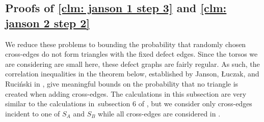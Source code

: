 \documentclass[11pt]{article}
\newcommand{\gd}[1]{{\color{blue}[Greg: #1]}}
\newcommand{\overbar}[1]{\mkern 1.5mu\overline{\mkern-1.5mu#1\mkern-1.5mu}\mkern 1.5mu}
\theoremstyle{plain}
\begin{document}

    
    

    \subsection{Proofs of \cref{clm: janson 1 step 3} and \cref{clm: janson 2 step 2}}\label{sec: janson args}



We reduce these problems to bounding the probability that randomly chosen cross-edges do not form triangles with the fixed defect edges. Since the torsos we are considering are small here, these defect graphs are fairly regular. As such, the correlation inequalities in the theorem below, established by Janson, {\L}uczak, and Ruci\'nski in \cite{janson1988exponential}, give meaningful bounds on the probability that no triangle is created when adding cross-edges. The calculations in this subsection are very similar to the calculations in~subsection 6 of \cite{osthus2003densities}, but we consider only cross-edges incident to one of $S_A$ and $S_B$ while all cross-edges are considered in \cite{osthus2003densities}.
\end{document}
